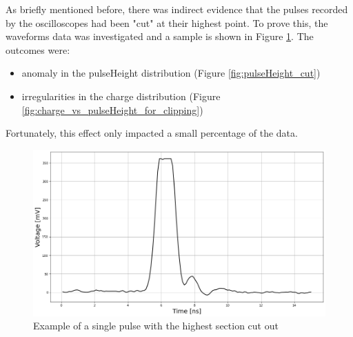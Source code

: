 As briefly mentioned before, there was indirect evidence that the pulses recorded by the oscilloscopes had been "cut" at their highest point. To prove this, the waveforms data was investigated and a sample is shown in Figure \ref{fig:clipped_pulse}. The outcomes were:

\begin{itemize}
    \item anomaly in the pulseHeight distribution (Figure \ref{fig:pulseHeight_cut})
    \item irregularities in the charge distribution (Figure \ref{fig:charge_vs_pulseHeight_for_clipping})
\end{itemize}
Fortunately, this effect only impacted a small percentage of the data.

\begin{figure}[!ht]
    \centering
    \includegraphics[width=.9\linewidth]{Images/detailed_analysis/Waveform of clipped pulse (ns).png}
    \caption{Example of a single pulse with the highest section cut out}
    \label{fig:clipped_pulse}
\end{figure}
 









